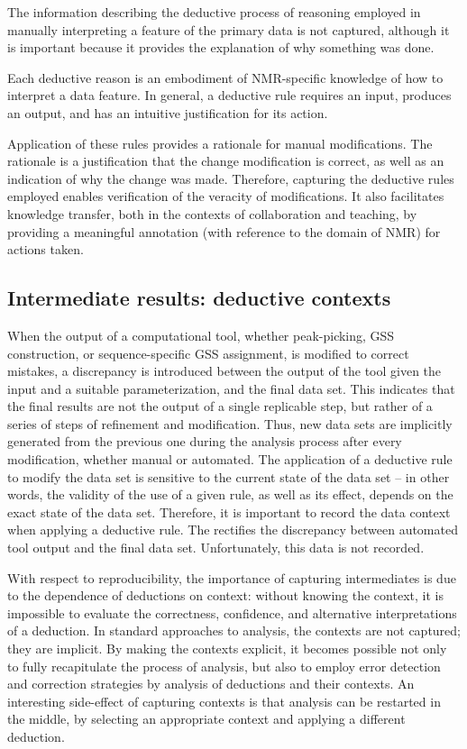 The information describing the deductive process of reasoning employed in 
manually interpreting a feature of the primary data is not captured, although
it is important because it provides the explanation 
of why something was done.

Each deductive reason is an embodiment of NMR-specific knowledge of how to 
interpret a data feature.  In general, a deductive rule requires an input, 
produces an output, and has an intuitive justification for its action.

Application of these rules provides a rationale for manual modifications.  The
rationale is a justification that the change modification is correct, as
well as an indication of why the change was made.  Therefore, capturing the
deductive rules employed enables verification of the veracity of modifications. 
It also facilitates knowledge transfer, both in the contexts of collaboration
and teaching, by providing a meaningful annotation (with reference to the
domain of NMR) for actions taken.


\subsection{Intermediate results: deductive contexts}
When the output of a computational tool, whether peak-picking, GSS construction, 
or sequence-specific GSS assignment, is modified to correct mistakes,
a discrepancy is introduced between the output of the tool 
given the input and a suitable parameterization, and the final data set. 
This indicates that the final results are not the output of a single 
replicable step, but rather of a series of steps of refinement and 
modification.  Thus, new data sets are implicitly generated from the previous
one during the analysis process after every modification, whether manual or automated.
The application of a deductive rule to modify the data set is sensitive to
the current state of the data set -- in other words, the validity of the 
use of a given rule, as well as its effect, depends on the exact state of
the data set.  Therefore, it is important to record the data context when
applying a deductive rule.  The rectifies the discrepancy between automated
tool output and the final data set.  Unfortunately, this data is not recorded.

With respect to reproducibility, the importance of capturing intermediates is 
due to the dependence of deductions on context: without knowing the context, 
it is impossible to evaluate the correctness, confidence, and alternative 
interpretations of a deduction.  In standard approaches to analysis, the 
contexts are not captured; they are implicit.  By making the contexts 
explicit, it becomes possible not only to fully recapitulate the process of 
analysis, but also to employ error detection and correction strategies by 
analysis of deductions and their contexts.  An interesting side-effect of 
capturing contexts is that analysis can be restarted in the middle, by 
selecting an appropriate context and applying a different deduction.

